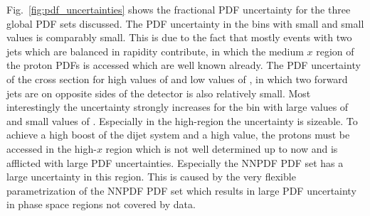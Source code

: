 Fig.~\ref{fig:pdf_uncertainties} shows the fractional PDF uncertainty for the
three global PDF sets discussed. The PDF uncertainty in the bins with small
\ystar and small \yboost values is comparably small. This is due to the fact
that mostly events with two jets which are balanced in rapidity contribute, in
which the medium $x$ region of the proton PDFs is accessed which are well known
already. The PDF uncertainty of the cross section for high values of \ystar and
low values of \yboost, in which two forward jets are on opposite sides of the
detector is also relatively small. Most interestingly the uncertainty strongly
increases for the bin with large values of \yboost and small values of \ystar.
Especially in the high-\pt region the uncertainty is sizeable. To achieve a high
boost of the dijet system and a high \ptavg value, the protons must be accessed
in the high-$x$ region which is not well determined up to now and is afflicted
with large PDF uncertainties. Especially the NNPDF PDF set has a large
uncertainty in this region. This is caused by the very flexible parametrization
of the NNPDF PDF set which results in large PDF uncertainty in phase space
regions not covered by data.

